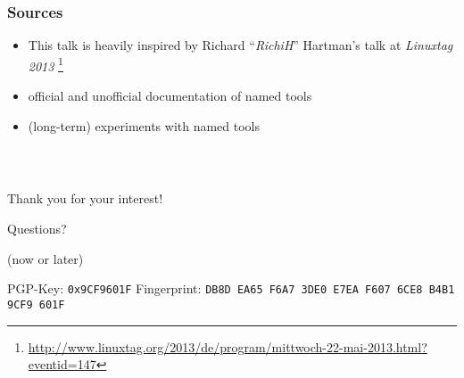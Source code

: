 \documentclass[english,hyperref={pdfpagelabels=false},aspectratio=169]{beamer}
\begin{document}
\begin{frame}
  \frametitle{Sources}
  \begin{itemize}
    \item This talk is heavily inspired by Richard ``\textit{RichiH}'' Hartman's talk at \textit{Linuxtag 2013}
      \footnote{\tiny\url{http://www.linuxtag.org/2013/de/program/mittwoch-22-mai-2013.html?eventid=147}}
    \item official and unofficial documentation of named tools
    \item (long-term) experiments with named tools
  \end{itemize}
\end{frame}

\begin{frame}
  \frametitle{~}
  \begin{center}
    {\huge Thank you for your interest!}\par
    \bigskip
    \bigskip
    \bigskip
    {\Large Questions?}\par
    {\scriptsize\color{fzjgray50}(now or later)}\par
    \bigskip
    \bigskip
    {\tiny PGP-Key: \texttt{0x9CF9601F} \hspace{2em} Fingerprint: \texttt{DB8D EA65 F6A7 3DE0 E7EA F607 6CE8 B4B1 9CF9 601F}}
  \end{center}
\end{frame}
\end{document}
